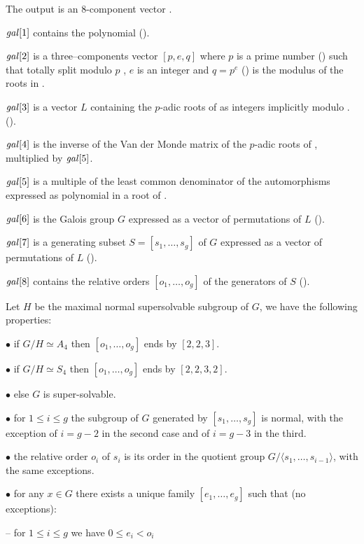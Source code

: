 The output is an 8-component vector .

 $\hbox{\it gal\/}[1]$ contains the polynomial 
 ().

 $\hbox{\it gal\/}[2]$ is a three--components vector $[p,e,q]$ where $p$ is a
 prime number () such that  totally split
 modulo $p$ , $e$ is an integer and $q=p^e$ () is the
 modulus of the roots in .

 $\hbox{\it gal\/}[3]$ is a vector $L$ containing the $p$-adic roots of
  as integers implicitly modulo .
 ().

 $\hbox{\it gal\/}[4]$ is the inverse of the Van der Monde matrix of the
 $p$-adic roots of , multiplied by $\hbox{\it gal\/}[5]$.

 $\hbox{\it gal\/}[5]$ is a multiple of the least common denominator of the
 automorphisms expressed as polynomial in a root of .

 $\hbox{\it gal\/}[6]$ is the Galois group $G$ expressed as a vector of
 permutations of $L$ ().

 $\hbox{\it gal\/}[7]$ is a generating subset $S=[s_1,\ldots,s_g]$ of $G$
 expressed as a vector of permutations of $L$ ().

 $\hbox{\it gal\/}[8]$ contains the relative orders $[o_1,\ldots,o_g]$ of
 the generators of $S$ ().

Let $H$ be the maximal normal supersolvable subgroup of $G$, we have the
following properties:

\quad$\bullet$ if $G/H\simeq A_4$ then $[o_1,\ldots,o_g]$ ends by
$[2,2,3]$.

\quad$\bullet$ if $G/H\simeq S_4$ then $[o_1,\ldots,o_g]$ ends by
$[2,2,3,2]$.

\quad$\bullet$ else $G$ is super-solvable.

\quad$\bullet$ for $1\leq i \leq g$ the subgroup of $G$ generated by
$[s_1,\ldots,s_g]$ is normal, with the exception of $i=g-2$ in the
second case and of $i=g-3$ in the third.

\quad$\bullet$ the relative order $o_i$ of $s_i$ is its order in the
quotient group $G/\langle s_1,\ldots,s_{i-1}\rangle$, with the same
exceptions.

\quad$\bullet$ for any $x\in G$ there exists a unique family
$[e_1,\ldots,e_g]$ such that (no exceptions):

-- for $1\leq i \leq g$ we have $0\leq e_i<o_i$

